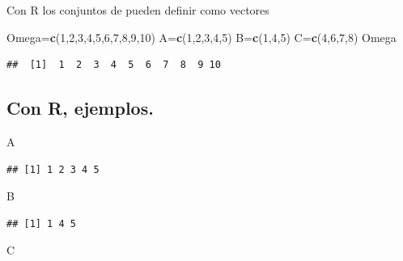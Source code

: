 \documentclass[]{book}
\newenvironment{Shaded}{\begin{snugshade}}{\end{snugshade}}
\newcommand{\DecValTok}[1]{\textcolor[rgb]{0.00,0.00,0.81}{#1}}
\newcommand{\KeywordTok}[1]{\textcolor[rgb]{0.13,0.29,0.53}{\textbf{#1}}}
\newcommand{\NormalTok}[1]{#1}
\begin{document}
Con R los conjuntos de pueden definir como vectores

\begin{Shaded}
\begin{Highlighting}[]
\NormalTok{Omega=}\KeywordTok{c}\NormalTok{(}\DecValTok{1}\NormalTok{,}\DecValTok{2}\NormalTok{,}\DecValTok{3}\NormalTok{,}\DecValTok{4}\NormalTok{,}\DecValTok{5}\NormalTok{,}\DecValTok{6}\NormalTok{,}\DecValTok{7}\NormalTok{,}\DecValTok{8}\NormalTok{,}\DecValTok{9}\NormalTok{,}\DecValTok{10}\NormalTok{)}
\NormalTok{A=}\KeywordTok{c}\NormalTok{(}\DecValTok{1}\NormalTok{,}\DecValTok{2}\NormalTok{,}\DecValTok{3}\NormalTok{,}\DecValTok{4}\NormalTok{,}\DecValTok{5}\NormalTok{)}
\NormalTok{B=}\KeywordTok{c}\NormalTok{(}\DecValTok{1}\NormalTok{,}\DecValTok{4}\NormalTok{,}\DecValTok{5}\NormalTok{)}
\NormalTok{C=}\KeywordTok{c}\NormalTok{(}\DecValTok{4}\NormalTok{,}\DecValTok{6}\NormalTok{,}\DecValTok{7}\NormalTok{,}\DecValTok{8}\NormalTok{)}
\NormalTok{Omega}
\end{Highlighting}
\end{Shaded}

\begin{verbatim}
##  [1]  1  2  3  4  5  6  7  8  9 10
\end{verbatim}

\hypertarget{con-r-ejemplos.-1}{%
\subsection{Con R, ejemplos.}\label{con-r-ejemplos.-1}}

\begin{Shaded}
\begin{Highlighting}[]
\NormalTok{A}
\end{Highlighting}
\end{Shaded}

\begin{verbatim}
## [1] 1 2 3 4 5
\end{verbatim}

\begin{Shaded}
\begin{Highlighting}[]
\NormalTok{B}
\end{Highlighting}
\end{Shaded}

\begin{verbatim}
## [1] 1 4 5
\end{verbatim}

\begin{Shaded}
\begin{Highlighting}[]
\NormalTok{C}
\end{Highlighting}
\end{Shaded}
\end{document}
